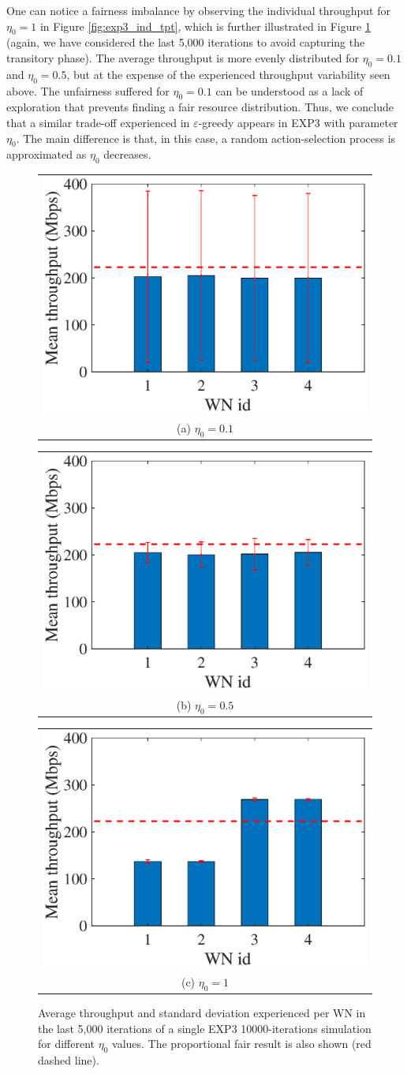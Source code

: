 \documentclass[preprint,12pt]{elsarticle}
\begin{document}
One can notice a fairness imbalance by observing the individual throughput for $\eta_0 = 1$ in Figure \ref{fig:exp3_ind_tpt}, which is further illustrated in Figure \ref{fig:exp3_avg_tpt} (again, we have considered the last 5,000 iterations to avoid capturing the transitory phase). The average throughput is more evenly distributed for $\eta_0 = 0.1$ and $\eta_0 = 0.5$, but at the expense of the experienced throughput variability seen above. The unfairness suffered for $\eta_0 = 0.1$ can be understood as a lack of exploration that prevents finding a fair resource distribution. Thus, we conclude that a similar trade-off experienced in $\varepsilon$-greedy appears in EXP3 with parameter $\eta_0$. The main difference is that, in this case, a random action-selection process is approximated as $\eta_0$ decreases.
\begin{figure}
	\centering
	\begin{tabular}{@{}c@{}}
		\includegraphics[width=.3\textwidth]{images/NEW_mean_tpt_EXP3_eta01} \\[\abovecaptionskip]
		\small (a) $\eta_0 = 0.1$
		\label{fig:exp3_eta01_avg_tpt}
	\end{tabular}	
	\hspace{\floatsep}	
	\begin{tabular}{@{}c@{}}
		\includegraphics[width=.3\textwidth]{images/NEW_mean_tpt_EXP3_eta05} \\[\abovecaptionskip]
		\small (b) $\eta_0 = 0.5$
		\label{fig:exp3_eta05_avg_tpt}
	\end{tabular}
	\hspace{\floatsep}
	\begin{tabular}{@{}c@{}}
		\includegraphics[width=.3\textwidth]{images/NEW_mean_tpt_EXP3_eta1} \\[\abovecaptionskip]
		\small (c) $\eta_0 = 1$
		\label{fig:exp3_eta1_avg_tpt}
	\end{tabular}
	\caption{Average throughput and standard deviation experienced per WN in the last 5,000 iterations of a single EXP3 10000-iterations simulation for different $\eta_0$ values. The proportional fair result is also shown (red dashed line).}
	\label{fig:exp3_avg_tpt}
\end{figure}
\end{document}
